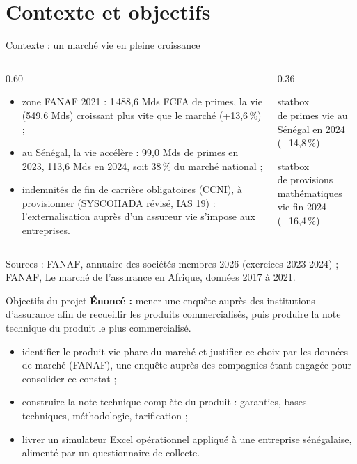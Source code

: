 \documentclass[aspectratio=169,11pt]{beamer}
\newcommand{\stat}[2]{%
  \begin{beamercolorbox}[wd=\linewidth,ht=1.5cm,dp=0.8cm,center,rounded=true]{statbox}%
    \centering{\LARGE\bfseries\textcolor{orangeC}{#1}}\\[0.15cm]
    {\small\textcolor{encre}{#2}}%
  \end{beamercolorbox}}
\begin{document}
\section{Contexte et objectifs}

\begin{frame}{Contexte : un marché vie en pleine croissance}
  \vspace{0.2cm}
  \begin{columns}[T]
    \begin{column}{0.60\textwidth}
      \begin{itemize}\itemsep0.25cm
        \item zone FANAF 2021 : 1\,488,6 Mds FCFA de primes, la vie
              (549,6 Mds) croissant plus vite que le marché (+13,6\,\%) ;
        \item au Sénégal, la vie accélère : 99,0 Mds de primes en 2023,
              113,6 Mds en 2024, soit 38\,\% du marché national ;
        \item indemnités de fin de carrière obligatoires (CCNI), à provisionner
              (SYSCOHADA révisé, IAS 19) : l'externalisation auprès d'un
              assureur vie s'impose aux entreprises.
      \end{itemize}
    \end{column}
    \begin{column}{0.36\textwidth}
      \stat{113,6 Mds}{de primes vie au Sénégal en 2024 (+14,8\,\%)}
      \vspace{0.25cm}
      \stat{346,1 Mds}{de provisions mathématiques vie fin 2024 (+16,4\,\%)}
    \end{column}
  \end{columns}
  \vspace{0.1cm}
  {\tiny Sources : FANAF, annuaire des sociétés membres 2026 (exercices 2023-2024) ; FANAF, Le marché de l'assurance en Afrique, données 2017 à 2021.}
\end{frame}

\begin{frame}{Objectifs du projet}
  \vspace{0.2cm}
  \textbf{Énoncé :} mener une enquête auprès des institutions d'assurance afin
  de recueillir les produits commercialisés, puis produire la note technique du
  produit le plus commercialisé.
  \vspace{0.3cm}
  \begin{itemize}\itemsep0.25cm
    \item identifier le produit vie phare du marché et justifier ce choix par
          les données de marché (FANAF), une enquête auprès des compagnies
          étant engagée pour consolider ce constat ;
    \item construire la note technique complète du produit : garanties, bases
          techniques, méthodologie, tarification ;
    \item livrer un simulateur Excel opérationnel appliqué à une entreprise
          sénégalaise, alimenté par un questionnaire de collecte.
  \end{itemize}
\end{frame}
\end{document}
